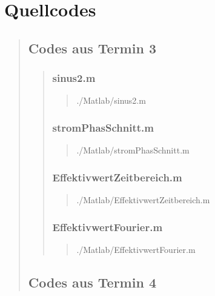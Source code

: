 \section{Quellcodes}
\begin{quote}
	
	\subsection{Codes aus Termin 3}
	\begin{quote}
	    \subsubsection{sinus2.m}
	    \begin{quote}
	        
	            {./Matlab/sinus2.m}
	    \end{quote}
    
	    \subsubsection{stromPhasSchnitt.m}
	    \begin{quote}
	        
	            {./Matlab/stromPhasSchnitt.m}
	    \end{quote}
    
	    \subsubsection{EffektivwertZeitbereich.m}
	    \begin{quote}
	        
	            {./Matlab/EffektivwertZeitbereich.m}
	    \end{quote}
    
	    \subsubsection{EffektivwertFourier.m}
	    \begin{quote}
	        
	            {./Matlab/EffektivwertFourier.m}
	    \end{quote}
	\end{quote}
	
	\subsection{Codes aus Termin 4}
	\begin{quote}
		

\end{quote}
\end{quote}
